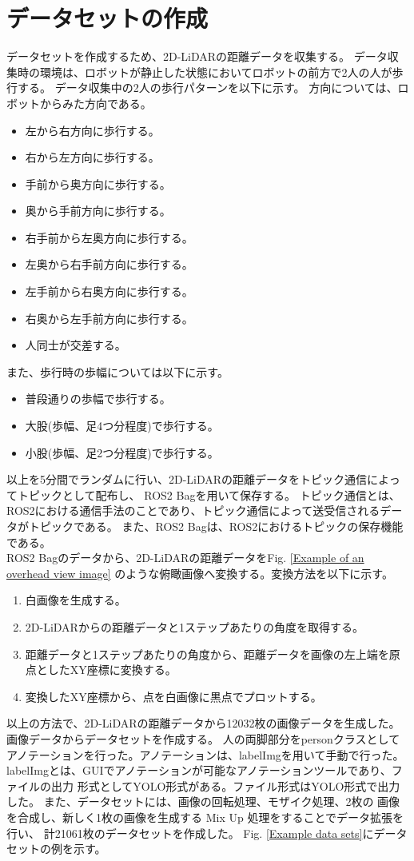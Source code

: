 \section{データセットの作成}
データセットを作成するため、2D-LiDARの距離データを収集する。
データ収集時の環境は、ロボットが静止した状態においてロボットの前方で2人の人が歩行する。
データ収集中の2人の歩行パターンを以下に示す。
方向については、ロボットからみた方向である。
\begin{itemize}
    \item 左から右方向に歩行する。
    \item 右から左方向に歩行する。
    \item 手前から奥方向に歩行する。
    \item 奥から手前方向に歩行する。
    \item 右手前から左奥方向に歩行する。
    \item 左奥から右手前方向に歩行する。
    \item 左手前から右奥方向に歩行する。
    \item 右奥から左手前方向に歩行する。
    \item 人同士が交差する。
\end{itemize}
また、歩行時の歩幅については以下に示す。
\begin{itemize}
    \item 普段通りの歩幅で歩行する。
    \item 大股(歩幅、足4つ分程度)で歩行する。
    \item 小股(歩幅、足2つ分程度)で歩行する。
\end{itemize}
以上を5分間でランダムに行い、2D-LiDARの距離データをトピック通信によってトピックとして配布し、
ROS2 Bagを用いて保存する。
トピック通信とは、ROS2における通信手法のことであり、トピック通信によって送受信されるデータがトピックである。
また、ROS2 Bagは、ROS2におけるトピックの保存機能である。\\ \indent
ROS2 Bagのデータから、2D-LiDARの距離データをFig. \ref{Example of an overhead view image}
のような俯瞰画像へ変換する。変換方法を以下に示す。
\begin{enumerate}
    \item 白画像を生成する。
    \item 2D-LiDARからの距離データと1ステップあたりの角度を取得する。
    \item 距離データと1ステップあたりの角度から、距離データを画像の左上端を原点としたXY座標に変換する。
    \item 変換したXY座標から、点を白画像に黒点でプロットする。
\end{enumerate}
以上の方法で、2D-LiDARの距離データから12032枚の画像データを生成した。\\ \indent
画像データからデータセットを作成する。
人の両脚部分をpersonクラスとしてアノテーションを行った。アノテーションは、labelImgを用いて手動で行った。
labelImgとは、GUIでアノテーションが可能なアノテーションツールであり、ファイルの出力
形式としてYOLO形式がある。ファイル形式はYOLO形式で出力した。
また、データセットには、画像の回転処理、モザイク処理、2枚の
画像を合成し、新しく1枚の画像を生成する Mix Up 処理をすることでデータ拡張を行い、
計21061枚のデータセットを作成した。
Fig. \ref{Example data sets}にデータセットの例を示す。

